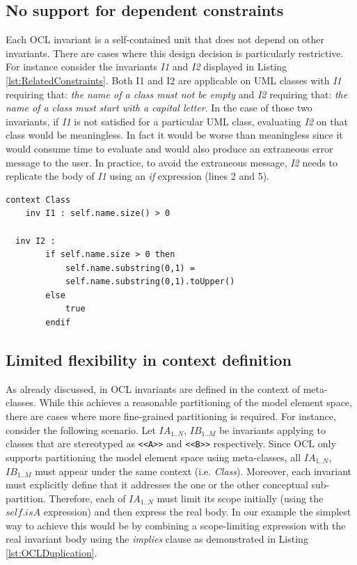 \subsection{No support for dependent constraints}
\label{sec:Issue3}
Each OCL invariant is a self-contained unit that does not depend on other invariants. There are cases where this design decision is particularly restrictive. For instance consider the invariants \emph{I1} and \emph{I2} displayed in Listing \ref{lst:RelatedConstraints}. Both I1 and I2 are applicable on UML classes with \emph{I1} requiring that: \textit{the name of a class must not be empty} and \emph{I2} requiring that: \textit{the name of a class must start with a capital letter}. In the case of those two invariants, if \emph{I1} is not satisfied for a particular UML class, evaluating \emph{I2} on that class would be meaningless. In fact it would be worse than meaningless since it would consume time to evaluate and would also produce an extraneous error message to the user. In practice, to avoid the extraneous message, \emph{I2} needs to replicate the body of \emph{I1} using an \textit{if} expression (lines 2 and 5).

\begin{lstlisting}[basicstyle=\ttfamily\footnotesize, flexiblecolumns=true, numbers=none, nolol=true, caption=Conceptually related OCL constraints, label=lst:RelatedConstraints, numbers=left, tabsize=2, language=OCL]
context Class
	inv I1 : self.name.size() > 0
    	
  inv I2 : 
		if self.name.size > 0 then
			self.name.substring(0,1) =
			self.name.substring(0,1).toUpper()
		else
			true
		endif
\end{lstlisting}

\subsection{Limited flexibility in context definition}
\label{sec:Issue4}
As already discussed, in OCL invariants are defined in the context of meta-classes. While this achieves a reasonable partitioning of the model element space, there are cases where more fine-grained partitioning is required. For instance, consider the following scenario. Let $IA_{1..N}$, $IB_{1..M}$ be invariants applying to classes that are stereotyped as \verb|<<A>>| and \verb|<<B>>| respectively. Since OCL only supports partitioning the model element space using meta-classes, all $IA_{1..N}$, $IB_{1..M}$ must appear under the same context (i.e. \textit{Class}). Moreover, each invariant must explicitly define that it addresses the one or the other conceptual sub-partition. Therefore, each of $IA_{1..N}$ must limit its scope initially (using the $self.isA$ expression) and then express the real body. In our example the simplest way to achieve this would be by combining a scope-limiting expression with the real invariant body using the \textit{implies} clause as demonstrated in Listing \ref{lst:OCLDuplication}.

